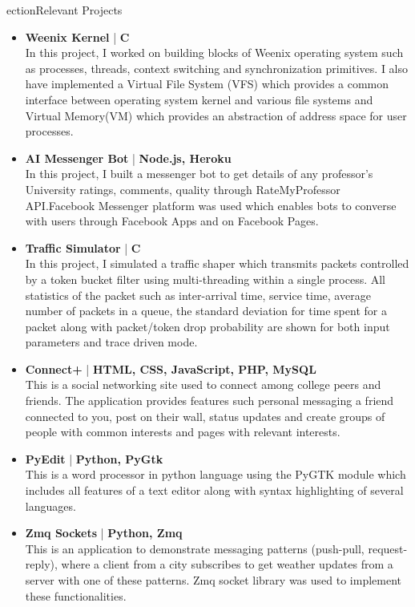 ection{Relevant Projects}
\begin{itemize}

 \item \textbf{Weenix Kernel} | \textbf{C}\\
In this project, I worked on building blocks of Weenix operating system such as processes, threads, context switching and synchronization primitives. I also have implemented a Virtual File System (VFS) which provides a common interface between operating system kernel and various file systems and Virtual Memory(VM) which provides an abstraction of address space for user processes.

 \item \textbf{AI Messenger Bot} | \textbf {Node.js, Heroku }\\
 In this project, I built a messenger bot to get details of any professor's University ratings, comments, quality through RateMyProfessor API.Facebook Messenger platform was used which enables bots to converse with users through Facebook Apps and on Facebook Pages.
 
 \item \textbf{Traffic Simulator} | \textbf{C}\\
In this project, I simulated a traffic shaper which transmits packets controlled by a token bucket filter using multi-threading within a single process. All statistics of the packet such as inter-arrival time, service time, average number of packets in a queue, the standard deviation for time spent for a packet along with packet/token drop probability are shown for both input parameters and trace driven mode. 

 \item \textbf{Connect+} | \textbf{HTML, CSS, JavaScript, PHP, MySQL}\\
This is a social networking site used to connect among college peers and friends. The application provides features such personal messaging a friend connected to you, post on their wall, status updates and create groups of people with common interests and pages with relevant interests.

 \item \textbf{PyEdit} | \textbf {Python, PyGtk} \\
This is a word processor in python language using the PyGTK module which includes all features of a text editor along with syntax highlighting of several languages.

 \item \textbf{Zmq Sockets} | \textbf { Python, Zmq}\\
 This is an application to demonstrate messaging patterns (push-pull, request-reply), where a client from a city subscribes to get weather updates from a server with one of these patterns. Zmq socket library was used to implement these functionalities.
 
\end{itemize}
\vspace{5pt}
